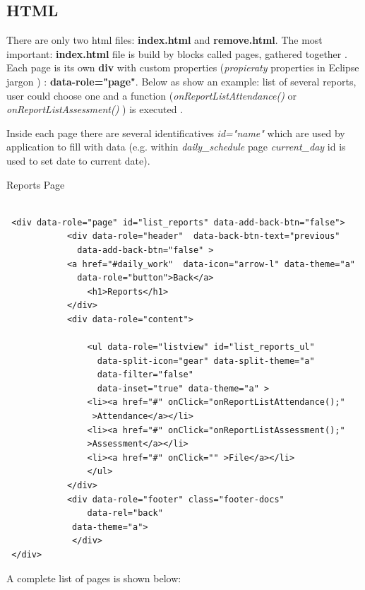     
	\subsection{HTML}
  There are only two html files: \textbf{index.html} and \textbf{remove.html}. The most important: \textbf{index.html} file is build by
   blocks called pages, gathered together \cite{JQueryMobilePage}. Each page is its own {\bf div } 
   with custom properties (\emph{propieraty} properties in Eclipse jargon ) : {\bf data-role="page"}. Below as show an example: list of several reports, user could choose one and a function (\emph{onReportListAttendance() } or \emph{onReportListAssessment() }  ) is executed .
   
   
  Inside each page there are several identificatives \emph{id="name"} which are used by application to fill with data (e.g.
   within \emph{daily\_schedule} page \emph{current\_day} id is used to set date to current date). 
  
\begin{bclogo}[couleur=blue!30,arrondi=0.1,ombre=true ] 
{Reports Page}
\begin{verbatim}
  
 <div data-role="page" id="list_reports" data-add-back-btn="false">
            <div data-role="header"  data-back-btn-text="previous" 
              data-add-back-btn="false" >
            <a href="#daily_work"  data-icon="arrow-l" data-theme="a" 
              data-role="button">Back</a>
                <h1>Reports</h1>
            </div>
            <div data-role="content">

                <ul data-role="listview" id="list_reports_ul" 
                  data-split-icon="gear" data-split-theme="a" 
                  data-filter="false" 
                  data-inset="true" data-theme="a" >
                <li><a href="#" onClick="onReportListAttendance();"
                 >Attendance</a></li>
                <li><a href="#" onClick="onReportListAssessment();" 
                >Assessment</a></li>
                <li><a href="#" onClick="" >File</a></li>
                </ul>
            </div>
            <div data-role="footer" class="footer-docs" 
                data-rel="back"
             data-theme="a">
             </div>
 </div>
\end{verbatim}

\end{bclogo}

A complete list of pages is shown below:

